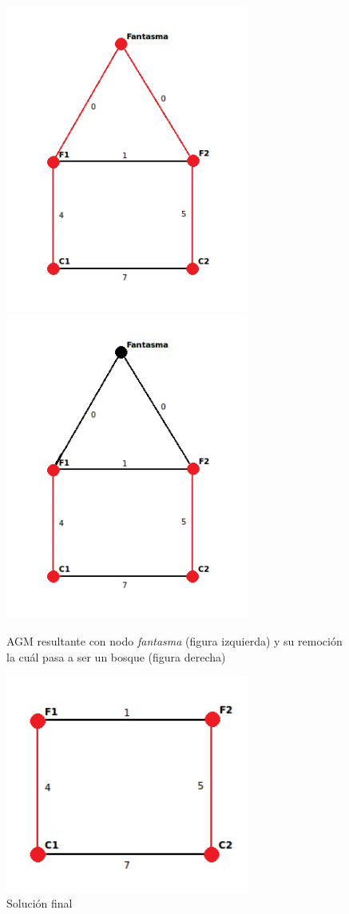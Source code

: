 \documentclass[a4paper, 10pt, twoside]{article}
\begin{document}
\begin{figure}[H]
\includegraphics[width=80mm]{../ejemplo_graficos/CosoDosSubconjuntosConNodoFantasmaSolucion.png}
\includegraphics[width=80mm]{../ejemplo_graficos/CosoDosSubconjuntosSolucionSinFantasma.png}
\caption{AGM resultante con nodo \textit{fantasma} (figura izquierda) y su remoción la cuál pasa a ser un bosque (figura derecha)}
\end{figure} 

\begin{figure}[H]
\centering
\includegraphics[width=80mm]{../ejemplo_graficos/CosoDosSubconjuntosSolucion.png}
\caption{Solución final}
\label{5}
\end{figure} 
\end{document}

